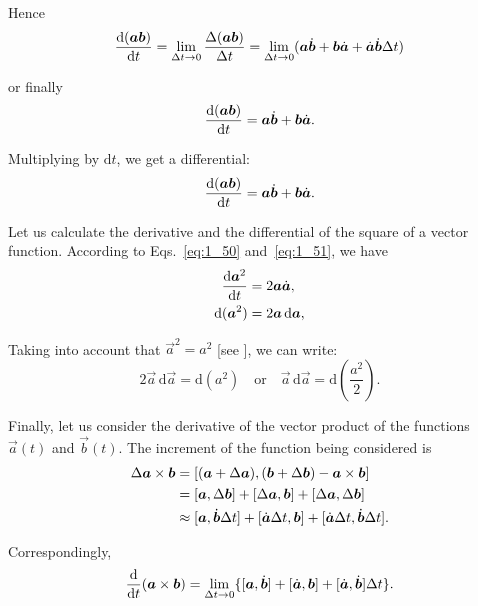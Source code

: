 \noindent
Hence
\begin{equation*}
\frac{\mathrm{d}(\boldsymbol{a}\boldsymbol{b})}{\mathrm{d} t} = \lim_{\Delta t\to 0} \frac{\Delta(\boldsymbol{a}\boldsymbol{b})}{\Delta t} = \lim_{\Delta t\to 0} (\boldsymbol{a}\dot{\boldsymbol{b}} + \boldsymbol{b}\dot{\boldsymbol{a}} + \dot{\boldsymbol{a}}\dot{\boldsymbol{b}}\Delta t)
\end{equation*}

\noindent
or finally
\begin{equation}\label{eq:1_50}
\frac{\mathrm{d}(\boldsymbol{a}\boldsymbol{b})}{\mathrm{d} t} = \boldsymbol{a}\dot{\boldsymbol{b}} + \boldsymbol{b}\dot{\boldsymbol{a}}.
\end{equation}

\noindent
Multiplying  by $\mathrm{d}t$, we get a differential:
\begin{equation}\label{eq:1_51}
\frac{\mathrm{d}(\boldsymbol{a}\boldsymbol{b})}{\mathrm{d} t} = \boldsymbol{a}\dot{\boldsymbol{b}} + \boldsymbol{b}\dot{\boldsymbol{a}}.
\end{equation}

Let us calculate the derivative and the differential of the square of a vector function. According to Eqs.~\eqref{eq:1_50} and~\eqref{eq:1_51}, we have
\begin{align}
\frac{\mathrm{d}\boldsymbol{a}^2}{\mathrm{d} t} &= 2\boldsymbol{a}\dot{\boldsymbol{a}},\label{eq:1_52}\\
\mathrm{d}(\boldsymbol{a}^2) &= 2\boldsymbol{a}\,\mathrm{d}\boldsymbol{a},\label{eq:1_53}
\end{align}

\noindent
Taking into account that $\vec{a}^2 = a^2$ [see ], we can write:
\begin{equation}\label{eq:1_54}
2\vec{a}\,\mathrm{d}\vec{a} = \mathrm{d}(a^2) \quad \text{or} \quad \vec{a}\,\mathrm{d}\vec{a} = \mathrm{d}\left(\frac{a^2}{2}\right).
\end{equation}

Finally, let us consider the derivative of the vector product of the functions $\vec{a}(t)$ and $\vec{b}(t)$. The increment of the function being considered is
\begin{align*}
\Delta\boldsymbol{a}\times\boldsymbol{b} &= [(\boldsymbol{a} + \Delta\boldsymbol{a}),(\boldsymbol{b} + \Delta\boldsymbol{b}) - \boldsymbol{a}\times\boldsymbol{b}]\\
&= [\boldsymbol{a},\Delta\boldsymbol{b}] + [\Delta\boldsymbol{a},\boldsymbol{b}] + [\Delta\boldsymbol{a},\Delta\boldsymbol{b}]\\
&\approx [\boldsymbol{a},\dot{\boldsymbol{b}}\Delta t] + [\dot{\boldsymbol{a}}\Delta t,\boldsymbol{b}] + [\dot{\boldsymbol{a}}\Delta t,\dot{\boldsymbol{b}}\Delta t].
\end{align*}

\noindent
Correspondingly,
\begin{equation*}
\frac{\mathrm{d}}{\mathrm{d} t}(\boldsymbol{a}\times\boldsymbol{b}) = \lim_{\Delta t\to 0} \{[\boldsymbol{a},\dot{\boldsymbol{b}}] + [\dot{\boldsymbol{a}},\boldsymbol{b}] + [\dot{\boldsymbol{a}},\dot{\boldsymbol{b}}]\Delta t\}.
\end{equation*}

